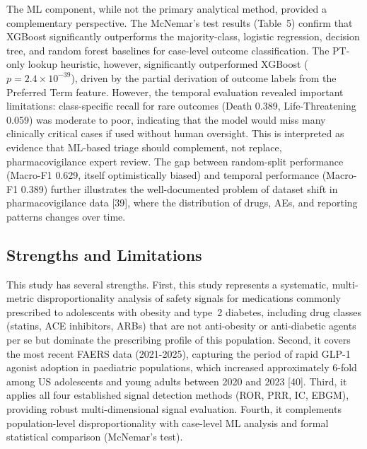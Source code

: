 \documentclass[10pt,a4paper]{article}
\begin{document}
The ML component, while not the primary analytical method, provided a complementary perspective. The McNemar's test results (Table~5) confirm that XGBoost significantly outperforms the majority-class, logistic regression, decision tree, and random forest baselines for case-level outcome classification. The PT-only lookup heuristic, however, significantly outperformed XGBoost ($p=2.4 \times 10^{-39}$), driven by the partial derivation of outcome labels from the Preferred Term feature. However, the temporal evaluation revealed important limitations: class-specific recall for rare outcomes (Death 0.389, Life-Threatening 0.059) was moderate to poor, indicating that the model would miss many clinically critical cases if used without human oversight. This is interpreted as evidence that ML-based triage should complement, not replace, pharmacovigilance expert review. The gap between random-split performance (Macro-F1 0.629, itself optimistically biased) and temporal performance (Macro-F1 0.389) further illustrates the well-documented problem of dataset shift in pharmacovigilance data [39], where the distribution of drugs, AEs, and reporting patterns changes over time.

\subsection{Strengths and Limitations}
This study has several strengths. First, this study represents a systematic, multi-metric disproportionality analysis of safety signals for medications commonly prescribed to adolescents with obesity and type~2 diabetes, including drug classes (statins, ACE inhibitors, ARBs) that are not anti-obesity or anti-diabetic agents per se but dominate the prescribing profile of this population. Second, it covers the most recent FAERS data (2021-2025), capturing the period of rapid GLP-1 agonist adoption in paediatric populations, which increased approximately 6-fold among US adolescents and young adults between 2020 and 2023 [40]. Third, it applies all four established signal detection methods (ROR, PRR, IC, EBGM), providing robust multi-dimensional signal evaluation. Fourth, it complements population-level disproportionality with case-level ML analysis and formal statistical comparison (McNemar's test).
\end{document}
